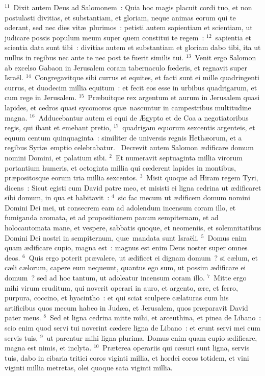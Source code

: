 ${}^{11}$~Dixit autem Deus ad Salomonem~: Quia hoc magis placuit cordi tuo, et non postulasti divitias, et substantiam, et gloriam, neque animas eorum qui te oderant, sed nec dies vit\ae\ plurimos~: petisti autem sapientiam et scientiam, ut judicare possis populum meum super quem constitui te regem~:
${}^{12}$~sapientia et scientia data sunt tibi~: divitias autem et substantiam et gloriam dabo tibi, ita ut nullus in regibus nec ante te nec post te fuerit similis tui.
${}^{13}$~Venit ergo Salomon ab excelso Gabaon in Jerusalem coram tabernaculo fœderis, et regnavit super Isra\"el.
${}^{14}$~Congregavitque sibi currus et equites, et facti sunt ei mille quadringenti currus, et duodecim millia equitum~: et fecit eos esse in urbibus quadrigarum, et cum rege in Jerusalem.
${}^{15}$~Pr\ae buitque rex argentum et aurum in Jerusalem quasi lapides, et cedros quasi sycomoros qu\ae\ nascuntur in campestribus multitudine magna.
${}^{16}$~Adducebantur autem ei equi de \AE gypto et de Coa a negotiatoribus regis, qui ibant et emebant pretio,
${}^{17}$~quadrigam equorum sexcentis argenteis, et equum centum quinquaginta~: similiter de universis regnis Heth\ae orum, et a regibus Syri\ae\ emptio celebrabatur.
~Decrevit autem Salomon \ae dificare domum nomini Domini, et palatium sibi.
${}^{2}$~Et numeravit septuaginta millia virorum portantium humeris, et octoginta millia qui c\ae derent lapides in montibus, pr\ae positosque eorum tria millia sexcentos.
${}^{3}$~Misit quoque ad Hiram regem Tyri, dicens~: Sicut egisti cum David patre meo, et misisti ei ligna cedrina ut \ae dificaret sibi domum, in qua et habitavit~:
${}^{4}$~sic fac mecum ut \ae dificem domum nomini Domini Dei mei, ut consecrem eam ad adolendum incensum coram illo, et fumiganda aromata, et ad propositionem panum sempiternam, et ad holocautomata mane, et vespere, sabbatis quoque, et neomeniis, et solemnitatibus Domini Dei nostri in sempiternum, qu\ae\ mandata sunt Isra\"eli.
${}^{5}$~Domus enim quam \ae dificare cupio, magna est~: magnus est enim Deus noster super omnes deos.
${}^{6}$~Quis ergo poterit pr\ae valere, ut \ae dificet ei dignam domum~? si c\ae lum, et c\ae li c\ae lorum, capere eum nequeunt, quantus ego sum, ut possim \ae dificare ei domum~? sed ad hoc tantum, ut adoleatur incensum coram illo.
${}^{7}$~Mitte ergo mihi virum eruditum, qui noverit operari in auro, et argento, \ae re, et ferro, purpura, coccino, et hyacintho~: et qui sciat sculpere c\ae laturas cum his artificibus quos mecum habeo in Jud\ae a, et Jerusalem, quos pr\ae paravit David pater meus.
${}^{8}$~Sed et ligna cedrina mitte mihi, et arceuthina, et pinea de Libano~: scio enim quod servi tui noverint c\ae dere ligna de Libano~: et erunt servi mei cum servis tuis,
${}^{9}$~ut parentur mihi ligna plurima. Domus enim quam cupio \ae dificare, magna est nimis, et inclyta.
${}^{10}$~Pr\ae terea operariis qui c\ae suri sunt ligna, servis tuis, dabo in cibaria tritici coros viginti millia, et hordei coros totidem, et vini viginti millia metretas, olei quoque sata viginti millia.


